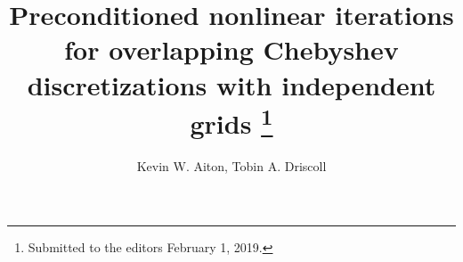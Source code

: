 

\usepackage{lipsum}
\usepackage{amsfonts}
\usepackage{graphicx}
\usepackage{epstopdf}
\usepackage{algorithmic}
\ifpdf
\else
\fi

\newcommand{\creflastconjunction}{, and~}






\title{Preconditioned nonlinear iterations for overlapping Chebyshev discretizations with independent grids \thanks{Submitted to the editors February 1, 2019.
}}

\author{Kevin W. Aiton, Tobin A. Driscoll}

\usepackage{amsopn}
\DeclareMathOperator{\diag}{diag}


